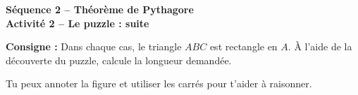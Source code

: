 \documentclass[11pt,a4paper,landscape]{article}
\begin{document}

\begin{center}
  {\sffamily\LARGE\bfseries\color{TitreC}
  Séquence 2 -- Théorème de Pythagore}\\[-0.05em]

  {\sffamily\large\bfseries\color{SavoirC}
  Activité 2 -- Le puzzle : suite}
\end{center}

\vspace{-0.3em}


\begin{tcolorbox}[
  enhanced,
  colback=SavoirBg,
  colframe=SavoirC!45,
  boxrule=0.5pt,
  arc=1.5mm,
  left=3mm,
  right=3mm,
  top=1mm,
  bottom=1mm,
  before skip=0mm,
  after skip=2mm
]

\small
\textbf{Consigne :}
Dans chaque cas, le triangle \(ABC\) est rectangle en \(A\).
À l'aide de la découverte du puzzle, calcule la longueur demandée.

Tu peux annoter la figure et utiliser les carrés pour t'aider à raisonner.

\end{tcolorbox}

\end{document}
